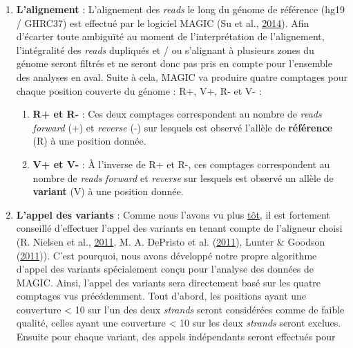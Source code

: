 \documentclass[12pt,twoside]{reedthesis}
\providecommand{\tightlist}{%
  \setlength{\itemsep}{0pt}\setlength{\parskip}{0pt}}
\theoremstyle{definition}
\theoremstyle{definition}
\theoremstyle{remark}
\begin{document}
  \begin{enumerate}
  \def\labelenumi{\arabic{enumi}.}
  \tightlist
  \item
    \textbf{L'alignement} : L'alignement des \emph{reads} le long du
    génome de référence (hg19 / GHRC37) est effectué par le logiciel MAGIC
    (Su et al., \protect\hyperlink{ref-Su2014}{2014}). Afin d'écarter
    toute ambiguïté au moment de l'interprétation de l'alignement,
    l'intégralité des \emph{reads} dupliqués et / ou s'alignant à
    plusieurs zones du génome seront filtrés et ne seront donc pas pris en
    compte pour l'ensemble des analyses en aval. Suite à cela, MAGIC va
    produire quatre comptages pour chaque position couverte du génome :
    R+, V+, R- et V- :
  
    \begin{enumerate}
    \def\labelenumii{\alph{enumii}.}
    \tightlist
    \item
      \textbf{R+ et R-} : Ces deux comptages correspondent au nombre de
      \emph{reads} \emph{forward} (+) et \emph{reverse} (-) sur lesquels
      est observé l'allèle de \textbf{référence} (R) à une position
      donnée.\\
    \item
      \textbf{V+ et V-} : À l'inverse de R+ et R-, ces comptages
      correspondent au nombre de \emph{reads} \emph{forward} et
      \emph{reverse} sur lesquels est observé un allèle de
      \textbf{variant} (V) à une position donnée.\\
    \end{enumerate}
  \item
    \textbf{L'appel des variants} : Comme nous l'avons vu plus
    \protect\hyperlink{varcall}{tôt}, il est fortement conseillé
    d'effectuer l'appel des variants en tenant compte de l'aligneur choisi
    (R. Nielsen et al., \protect\hyperlink{ref-Nielsen2011}{2011}, M. A.
    DePristo et al. (\protect\hyperlink{ref-DePristo2011}{2011}), Lunter
    \& Goodson (\protect\hyperlink{ref-Lunter2011}{2011})). C'est
    pourquoi, nous avons développé notre propre algorithme d'appel des
    variants spécialement conçu pour l'analyse des données de MAGIC.
    Ainsi, l'appel des variants sera directement basé sur les quatre
    comptages vus précédemment. Tout d'abord, les positions ayant une
    couverture \textless{} 10 sur l'un des deux \emph{strands} seront
    considérées comme de faible qualité, celles ayant une couverture
    \textless{} 10 sur les deux \emph{strands} seront exclues. Ensuite
    pour chaque variant, des appels indépendants seront effectués pour

\end{enumerate}
\end{document}
